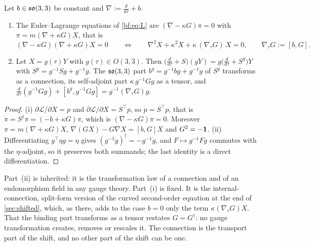 \begin{theorem}
\label{bf:covariant}
Let $b\in\mathfrak{so}(3,3)$ be constant and $\nabla:=\frac{d}{d\tau}+b$.
\begin{enumerate}[label=(\roman*),leftmargin=2.2em]
\item The Euler--Lagrange equations of \eqref{bf:eq:L} are $(\nabla-\kappa G)\pi=0$ with $\pi=m(\nabla+\kappa G)X$, that is
\begin{equation}
\label{bf:eq:covEL}
(\nabla-\kappa G)(\nabla+\kappa G)X=0\qquad\Longleftrightarrow\qquad \nabla^2X+\kappa^2X+\kappa\,(\nabla_{\!\tau}G)\,X=0,\qquad \nabla_{\!\tau}G:=[b,G].
\end{equation}
\item Let $X=g(\tau)Y$ with $g(\tau)\in O(3,3)$. Then $\bigl(\tfrac d{d\tau}+S\bigr)(gY)=g\bigl(\tfrac d{d\tau}+S^g\bigr)Y$ with
$S^g=g^{-1}Sg+g^{-1}\dot g$. The $\mathfrak{so}(3,3)$ part $b^g=g^{-1}bg+g^{-1}\dot g$ of $S^g$ transforms as a connection, its self-adjoint part
$\kappa\,g^{-1}Gg$ as a tensor, and $\tfrac d{d\tau}(g^{-1}Gg)+[b^g,g^{-1}Gg]=g^{-1}(\nabla_{\!\tau}G)g$.
\end{enumerate}
\end{theorem}

\begin{proof}
(i) $\partial\mathcal L/\partial\dot X=p$ and $\partial\mathcal L/\partial X=S^{\!\top}p$, so $\dot p=S^{\!\top}p$, that is
$\dot\pi=S^\dagger\pi=(-b+\kappa G)\pi$, which is $(\nabla-\kappa G)\pi=0$. Moreover $\pi=m(\nabla+\kappa G)X$, $\nabla(GX)-G\nabla X=[b,G]X$ and
$G^2=-\mathbf 1$. (ii) Differentiating $g^{\!\top}\eta g=\eta$ gives $(g^{-1}\dot g)^\dagger=-g^{-1}\dot g$, and $F\mapsto g^{-1}Fg$ commutes with the
$\eta$-adjoint, so it preserves both summands; the last identity is a direct differentiation.
\end{proof}

Part~(ii) is inherited: it is the transformation law of a connection and of an endomorphism field in any gauge theory. Part~(i) is fixed. It is
the internal-connection, split-form version of the curved second-order equation at the end of \cref{sec:shifted}, which, as there, adds to the case $b=0$ only the term
$\kappa(\nabla_{\!\tau}G)X$. That the binding part transforms as a tensor restates $G=G^\dagger$: no gauge transformation creates, removes or
rescales it. The connection is the transport part of the shift, and no other part of the shift can be one.

